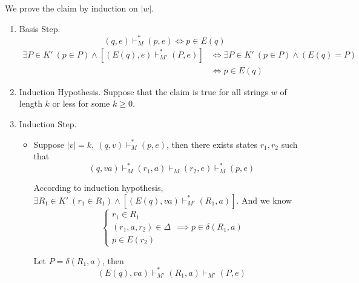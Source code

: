 \documentclass[aps,pra,onecolumn,notitlepage,superscriptaddress]{revtex4-1}
\def\y{\vdash}
\def\ys{\vdash^*}
\begin{document}
    We prove the claim by induction on $|w|$.
    \begin{enumerate}
        \item Basis Step.
        \begin{equation*}
            (q,e) \ys_M (p,e) \Longleftrightarrow p \in E(q)
        \end{equation*}
        \begin{align*}
            \exists P \in K' \ (p \in P) \land \left[(E(q), e) \ys_{M'} (P,e)\right]
            &\Longleftrightarrow \exists P \in K' \ (p \in P) \land (E(q) = P) \\
            &\Longleftrightarrow p \in E(q)
        \end{align*}

        \item Induction Hypothesis. Suppose that the claim is true for all strings $w$ of length $k$ or less for some $k \geq 0$.

        \item Induction Step. 
        \begin{itemize}
            \item Suppose $|v| = k, \ (q,v) \ys_M (p,e)$, then there exists states $r_1, r_2$ such that
            \begin{equation*}
                (q, va) \ys_M (r_1, a) \y_M (r_2, e) \ys_M (p,e)
            \end{equation*}
            
            According to induction hypothesis, $\exists R_1 \in K' \ (r_1 \in R_1) \land [(E(q), va) \ys_{M'} (R_1, a)]$. And we know 
            \begin{equation*}
                \begin{cases}
                    r_1 \in R_1 \\
                    (r_1, a, r_2) \in \Delta \\
                    p \in E(r_2)
                \end{cases}
                \implies p \in \delta(R_1, a)
            \end{equation*}
            
            Let $P = \delta(R_1, a)$, then
            \begin{equation*}
                (E(q), va) \ys_{M'} (R_1,a) \y_{M'} (P,e)
            \end{equation*}


\end{itemize}
\end{enumerate}
\end{document}
